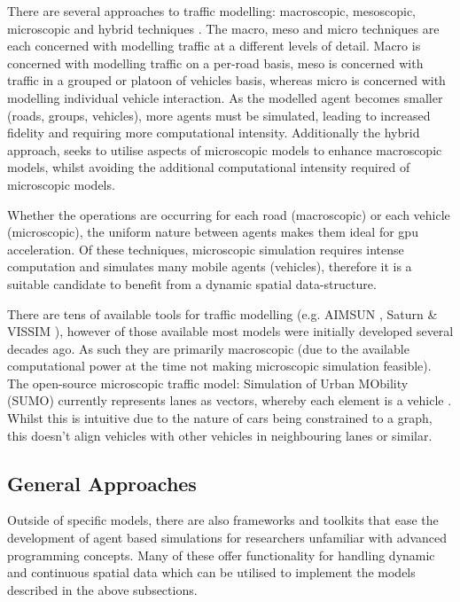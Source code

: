     There are several approaches to traffic modelling: macroscopic, mesoscopic, microscopic and hybrid techniques \cite{KH09}. The macro, meso and micro techniques are each concerned with modelling traffic at a different levels of detail. Macro is concerned with modelling traffic on a per-road basis, meso is concerned with traffic in a grouped or platoon of vehicles basis, whereas micro is concerned with modelling individual vehicle interaction. As the modelled agent becomes smaller (roads, groups, vehicles), more agents must be simulated, leading to increased fidelity and requiring more computational intensity. Additionally the hybrid approach, seeks to utilise aspects of microscopic models to enhance macroscopic models, whilst avoiding the additional computational intensity required of microscopic models. 
    
    Whether the operations are occurring for each road (macroscopic) or each vehicle (microscopic), the uniform nature between agents makes them ideal for \gls{gpu} acceleration. Of these techniques, microscopic simulation requires intense computation and simulates many mobile agents (vehicles), therefore it is a suitable candidate to benefit from a dynamic spatial data-structure.
     
    There are tens of available tools for traffic modelling (e.g. AIMSUN \cite{AIMSUN}, Saturn \cite{SATURN} \& VISSIM \cite{VISSIM}), however of those available most models were initially developed several decades ago. As such they are primarily macroscopic (due to the available computational power at the time not making microscopic simulation feasible). The open-source microscopic traffic model: Simulation of Urban MObility (SUMO) currently represents lanes as vectors, whereby each element is a vehicle \cite{SUMO}. Whilst this is intuitive due to the nature of cars being constrained to a graph, this doesn't align vehicles with other vehicles in neighbouring lanes or similar. %
    
  \subsection{General Approaches\label{sec:complex-general}}
    Outside of specific models, there are also frameworks and toolkits that ease the development of agent based simulations for researchers unfamiliar with advanced programming concepts. Many of these offer functionality for handling dynamic and continuous spatial data which can be utilised to implement the models described in the above subsections.
    
